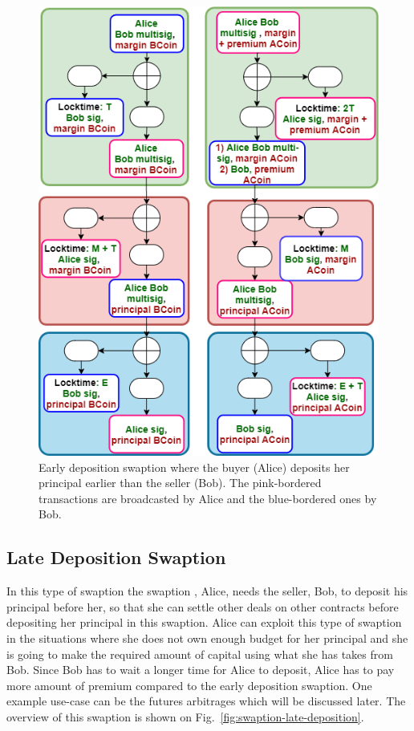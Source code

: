 \begin{figure}
    \centering
    \includegraphics[width=\textwidth]{figures/early dep.png}
    \caption{Early deposition swaption where the buyer (Alice) deposits her principal earlier than the seller (Bob). The pink-bordered transactions are broadcasted by Alice and the blue-bordered ones by Bob.}
    \label{fig:swaption-early-deposition}
\end{figure}


\subsection{Late Deposition Swaption}
In this type of swaption the swaption \SwaptionOwner, Alice, needs the seller, Bob, to deposit his principal before her, so that she can settle other deals on other contracts before depositing her principal in this swaption. Alice can exploit this type of swaption in the situations where she does not own enough budget for her principal and she is going to make the required amount of capital using what she has takes from Bob. Since Bob has to wait a longer time for Alice to deposit, Alice has to pay more amount of premium compared to the early deposition swaption.
One example use-case can be the futures arbitrages which will be discussed later. The overview of this swaption is shown on Fig.~\ref{fig:swaption-late-deposition}.

